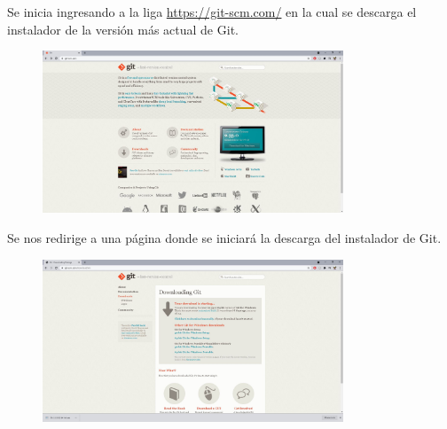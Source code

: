 \documentclass[10pt,a4paper]{article} %
\begin{document}
	\begin{enumerate}
		{\large
			\item Se inicia ingresando a la liga \underline{https://git-scm.com/} en la cual se descarga el instalador de la versi{\' o}n m{\' a}s actual de Git.
			\begin{figure}[H]
				\includegraphics[width=0.8\textwidth]{1.jpg}
				\centering
				\label{img:paso1}
			\end{figure}
			\item Se nos redirige a una p{\' a}gina donde se iniciar{\' a} la descarga del instalador de Git.
			\begin{figure}[H]
				\includegraphics[width=0.8\textwidth]{2.jpg}
				\centering
				\label{img:paso2}
			\end{figure}
			
}
\end{enumerate}
\end{document}
